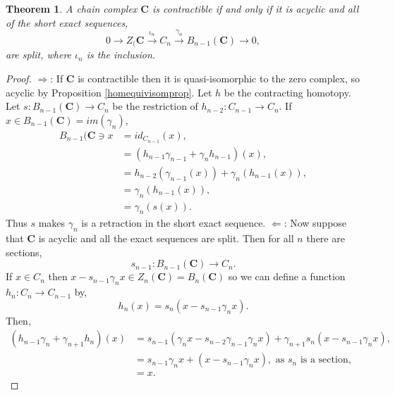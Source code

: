 \documentclass[11.5pt, twoside, a4paper, titlepage]{report}
\theoremstyle{definition}
\theoremstyle{plain}
\newtheorem{thm}[mydef]{Theorem}
\begin{document}
\begin{thm}
A chain complex $\mathbf{C}$ is contractible if and only if it is acyclic and all of the short exact sequences,
\begin{equation*}
0 \xrightarrow{} Z_(\mathbf{C} \xrightarrow{\iota_n} C_n \xrightarrow{\gamma_n} B_{n-1}(\mathbf{C})\xrightarrow{} 0,
\end{equation*}
are split, where $\iota_n$ is the inclusion.
\end{thm}
\begin{proof}
$\Rightarrow$: If $\mathbf{C}$ is contractible then it is quasi-isomorphic to the zero complex, so acyclic by Proposition \ref{homequivisomprop}. Let $h$ be the contracting homotopy. Let $s:B_{n-1}(\mathbf{C})\to C_n$ be the restriction of $h_{n-2}:C_{n-1} \to C_n$. If $x\in B_{n-1}(\mathbf{C})=im(\gamma_n)$,
\begin{align*}
B_{n-1}(\mathbf{C}\ni x&=id_{C_{n-1}}(x),\\
&=(h_{n-1}\gamma_{n-1} + \gamma_nh_{n-1})(x),\\
&=h_{n-2}(\gamma_{n-1}(x))+\gamma_n(h_{n-1}(x)),\\
&=\gamma_n(h_{n-1}(x)),\\
&=\gamma_n(s(x)).
\end{align*}
Thus $s$ makes $\gamma_n$ is a retraction in the short exact sequence.
$\Leftarrow$: Now suppose that $\mathbf{C}$ is acyclic and all the exact sequences are split. Then for all $n$ there are sections,
\begin{equation*}
s_{n-1}: B_{n-1}(\mathbf{C}) \to C_n.
\end{equation*}
If $x\in C_n$ then $x-s_{n-1}\gamma_nx\in Z_n(\mathbf{C})=B_n(\mathbf{C})$ so we can define a function $h_n: C_n \to C_{n-1}$ by,
\begin{equation*}
h_n(x)=s_n(x-s_{n-1}\gamma_nx).
\end{equation*}
Then,
\begin{align*}
(h_{n-1}\gamma_n + \gamma_{n+1}h_n)(x)&=s_{n-1}(\gamma_nx-s_{n-2}\gamma_{n-1}\gamma_nx) + \gamma_{n+1}s_n(x - s_{n-1}\gamma_nx),\\
&=s_{n-1}\gamma_nx +(x-s_{n-1}\gamma_nx), \text{ as } s_n \text{ is a section},\\
&=x.
\end{align*}
\end{proof}





\end{document}

